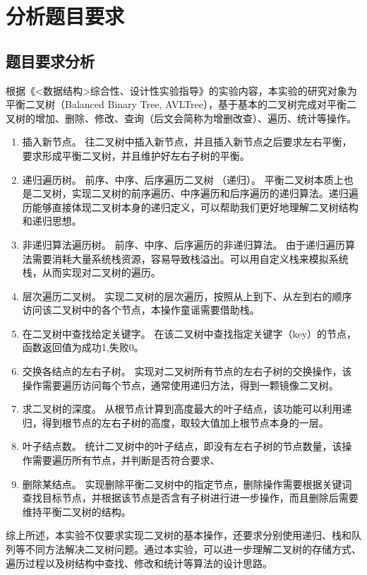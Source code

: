 \documentclass[a4paper, 12pt, oneside]{article}
\theoremstyle{cn_theorem}
\begin{document}
\vspace{3em}
\clearpage

\clearpage
\tableofcontents

\clearpage
{}
\setcounter{page}{1}

\section{分析题目要求}
\subsection{题目要求分析}
根据《<数据结构>综合性、设计性实验指导》的实验内容，本实验的研究对象为平衡二叉树（Balanced Binary Tree, AVLTree），基于基本的二叉树完成对平衡二叉树的增加、删除、修改、查询（后文会简称为增删改查）、遍历、统计等操作。
\begin{enumerate}
    \item {
          插入新节点。
          往二叉树中插入新节点，并且插入新节点之后要求左右平衡，
          要求形成平衡二叉树，并且维护好左右子树的平衡。
          }
    \item {
          递归遍历树。
          前序、中序、后序遍历二叉树 （递归）。
          平衡二叉树本质上也是二叉树，实现二叉树的前序遍历、中序遍历和后序遍历的递归算法。递归遍历能够直接体现二叉树本身的递归定义，可以帮助我们更好地理解二叉树结构和递归思想。
          }

    \item {
          非递归算法遍历树。
          前序、中序、后序遍历的非递归算法。
          由于递归遍历算法需要消耗大量系统栈资源，容易导致栈溢出。可以用自定义栈来模拟系统栈，从而实现对二叉树的遍历。
          }
    \item {
          层次遍历二叉树。
          实现二叉树的层次遍历，按照从上到下、从左到右的顺序访问该二叉树中的各个节点，本操作童谣需要借助栈。
          }
    \item {
          在二叉树中查找给定关键字。
          在该二叉树中查找指定关键字（key）的节点，函数返回值为成功1,失败0。
          }
    \item {
          交换各结点的左右子树。
          实现对二叉树所有节点的左右子树的交换操作，该操作需要遍历访问每个节点，通常使用递归方法，得到一颗镜像二叉树。
          }
    \item {
          求二叉树的深度。
          从根节点计算到高度最大的叶子结点，该功能可以利用递归，得到根节点的左右子树的高度，取较大值加上根节点本身的一层。
          }
    \item {
          叶子结点数。
          统计二叉树中的叶子结点，即没有左右子树的节点数量，该操作需要遍历所有节点，并判断是否符合要求、
          }
    \item {
          删除某结点。
          实现删除平衡二叉树中的指定节点，删除操作需要根据关键词查找目标节点，并根据该节点是否含有子树进行进一步操作，而且删除后需要维持平衡二叉树的结构。
          }
\end{enumerate}
综上所述，本实验不仅要求实现二叉树的基本操作，还要求分别使用递归、栈和队列等不同方法解决二叉树问题。通过本实验，可以进一步理解二叉树的存储方式、遍历过程以及树结构中查找、修改和统计等算法的设计思路。
\end{document}
